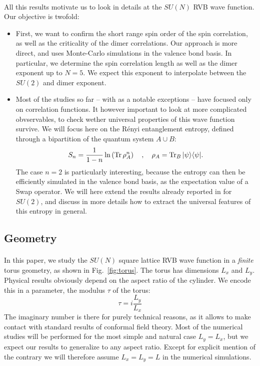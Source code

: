 \documentclass[11pt]{iopart}
\begin{document}
\paragraph{}
All this results motivate us to look in details at the $SU(N)$ RVB wave function. Our objective is twofold: 
\begin{itemize}
 \item First, we want to confirm the short range spin order of the spin correlation, as well as the criticality of the dimer correlations. Our approach is more direct, and uses Monte-Carlo simulations in the valence bond basis. In particular, we determine the spin correlation length as well as the dimer exponent up to $N=5$. We expect this exponent to interpolate between the $SU(2)$ and dimer exponent. 
 \item Most of the studies so far -- with \cite{Ju2012,Poilblanc} as a notable exceptions -- have focused only on correlation functions. It however important to look at more complicated obvservables, to check wether universal properties of this wave function survive. We will focus here on the R\'enyi entanglement entropy, defined through a bipartition of the quantum system $A\cup B$:
 \begin{equation}
  S_n=\frac{1}{1-n}\ln \left({\rm Tr}\, \rho_A^n\right)\quad ,\quad \rho_A={\rm Tr}_B\, |\psi\rangle \langle \psi|.
 \end{equation}
The case $n=2$ is particularly interesting, because the entropy can then be efficiently simulated in the valence bond basis, as the expectation value of a Swap operator\cite{swap}. We will here extend the results already reported in \cite{Ju2012} for $SU(2)$, and discuss in more details how to extract the universal features  of this entropy in general.
\end{itemize}
\subsection{Geometry}
\paragraph{}In this paper, we study the $SU(N)$ square lattice RVB wave function in a \emph{finite} torus geometry, as shown in Fig.~\ref{fig:torus}. The torus has dimensions $L_x$ and $L_y$. Physical results obviously depend on the aspect ratio of the cylinder. We encode this in a parameter, the modulus $\tau$ of the torus:
\begin{equation}
 \tau=i\frac{L_y}{L_x}
\end{equation}
The imaginary number is there for purely technical reasons, as it allows to make contact with standard results of conformal field theory. Most of the numerical studies will be performed for the most simple and natural case $L_y=L_x$, but we expect our results to generalize to any aspect ratio. Except for explicit mention of the contrary we will therefore assume $L_x=L_y=L$ in the numerical simulations.
\end{document}
